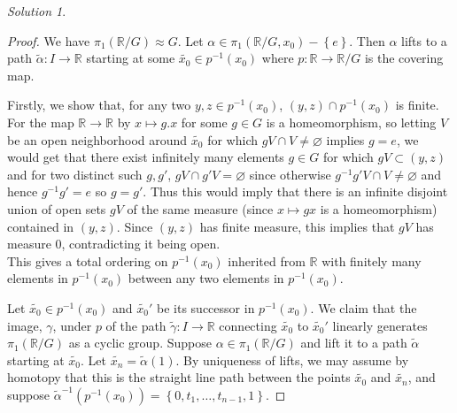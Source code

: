 \documentclass[reqno]{amsart}
\theoremstyle{definition}
\theoremstyle{remark}
\newtheorem*{solution}{Solution}
\begin{document}
\begin{solution}
        \begin{proof}
            We have $\pi_1 \left( \mathbb{R} / G \right) 
            \approx G$. Let $\alpha \in 
            \pi_1 \left( \mathbb{R} / G, x_0 \right) -
            \left\{ e \right\} $. Then
            $\alpha$ lifts to a path $\tilde{\alpha}
            \colon I \to \mathbb{R}$ starting
            at some $\tilde{x_0}\in p^{-1}(x_0)$ 
            where $p \colon \mathbb{R} \to \mathbb{R} /G$ is
            the covering map.\\
            \linebreak
            

            Firstly, we show that, for any
            two $y,z \in p^{-1}(x_0)$,
            $\left( y,z \right) \cap p^{-1}(x_0)$ is finite.
            For the map $\mathbb{R} \to \mathbb{R}$ by
            $x\mapsto g.x$ for some $g \in G$ is a homeomorphism,
            so letting $V$ be an open
            neighborhood around $\tilde{x_0}$ for
            which $g V \cap V \neq \varnothing$ implies
            $g = e$, we would get
            that there exist infinitely many elements
            $g \in G$ for which $g V \subset 
            \left( y,z \right) $ and for
            two distinct such $g,g'$, 
            $gV \cap g'V = \varnothing$ since
            otherwise $g^{-1}g' V \cap V \neq \varnothing$ and
            hence $g^{-1} g' = e$ so
            $g = g'$. Thus this would imply that
            there is an infinite disjoint union of
            open sets $gV$ of the same measure (since $x \mapsto 
            gx$ is a homeomorphism) contained in
            $\left( y,z \right) $. Since
            $\left( y,z \right) $ has finite measure, 
            this implies that
            $g V$ has measure $0$, contradicting it being open.\\
            \linebreak
            This gives a total ordering
            on $p^{-1}(x_0)$ inherited from
            $\mathbb{R}$ with finitely many elements
            in $p^{-1}(x_0)$ between any two elements
            in $p^{-1}(x_0)$.
            
            Let $\tilde{x_0} \in p^{-1}(x_0)$ and
            $\tilde{x_0}'$ be its successor in
            $p^{-1}(x_0)$. We claim that the image, $\gamma$,
            under $p$ of the
            path $\tilde{\gamma} \colon I \to \mathbb{R}$ connecting
            $\tilde{x_0}$ to $\tilde{x_0}'$ linearly
            generates $\pi_1 \left( \mathbb{R} /G \right) $ 
            as a cyclic group. Suppose
            $\alpha \in \pi_1 \left( \mathbb{R} /G \right) $ and
            lift it to a path $\tilde{\alpha}$ starting
            at $\tilde{x_0}$. Let
            $\tilde{x_n} = \tilde{\alpha}(1)$. By
            uniqueness of lifts, we may assume by homotopy
            that this is the straight line
            path between the points $\tilde{x_0}$ and
            $\tilde{x_n}$, and
            suppose
            $\tilde{\alpha}^{-1} \left( p^{-1}(x_0) \right)
            = \left\{ 0, t_1, \ldots, t_{n-1}, 1 \right\} $.
            

\end{proof}
\end{solution}
\end{document}

